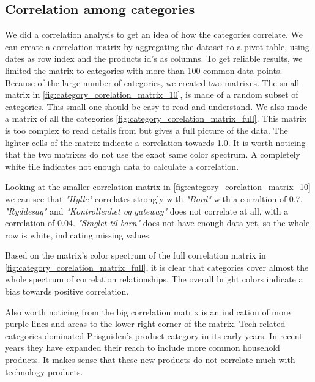 \subsection{Correlation among categories}
We did a correlation analysis to get an idea of how the categories correlate.
We can create a correlation matrix by aggregating the dataset to a pivot table, using dates as row index and the products id's as columns.
To get reliable results, we limited the matrix to categories with more than 100 common data points.
Because of the large number of categories, we created two matrixes. The small matrix in \autoref{fig:category_corelation_matrix_10},
is made of a random subset of categories.
This small one should be easy to read and understand.
We also made a matrix of all the categories \autoref{fig:category_corelation_matrix_full}. This matrix is too complex to read details from but gives a full picture of the data.
The lighter cells of the matrix indicate a correlation towards 1.0. It is worth noticing that the two matrixes do not use the exact same color spectrum.
A completely white tile indicates not enough data to calculate a correlation.

Looking at the smaller correlation matrix in \autoref{fig:category_corelation_matrix_10} we can see that
\textit{"Hylle"} correlates strongly  with \textit{"Bord"} with a corraltion of 0.7.
\textit{"Ryddesag"} and \textit{"Kontrollenhet og gateway"} does not correlate at all, with a correlation of 0.04.
\textit{"Singlet til barn"} does not have enough data yet, so the whole row is white, indicating missing values.


Based on the matrix's color spectrum of the full correlation matrix in \autoref{fig:category_corelation_matrix_full}, it is clear that categories cover almost the whole spectrum of correlation relationships.
The overall bright colors indicate a bias towards positive correlation.

Also worth noticing from the big correlation matrix is an indication of more purple lines and areas to the lower right corner of the matrix.
Tech-related categories dominated Prisguiden's product category in its early years. In recent years they have expanded their reach to include more common household
products. It makes sense that these new products do not correlate much with technology products.

